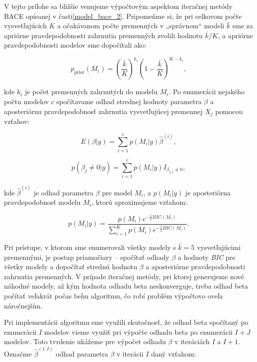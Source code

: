 V tejto prílohe sa bližšie venujeme výpočtovým aspektom iteračnej metódy BACE opísanej v časti\autoref{model_bace_2}.
Pripomeňme si, že pri celkovom počte vysvetľujúcich \(K\) a očakávanom počte premenných v „správnom“ modeli \(\bar{k}\)
sme za apriórne pravdepodobnosti zahrnutia premenných zvolili hodnotu \(\bar{k}/K\), a apriórne pravdepodobnosti modelov sme dopočítali ako:

\[
p_{\text{prior}}(M_i) = \left( \frac{\bar{k}}{K} \right)^{k_i} \left( 1 - \frac{\bar{k}}{K} \right)^{K - k_i},
\]

kde \( k_i \) je počet premenných zahrnutých do modelu \( M_i \).
Po enumerácii nejakého počtu modelov \(c\) spočítavame odhad strednej hodnoty parametra \(\beta\) a aposteriórnu pravdepodobnosť zahrnutia vysvetľujúcej premennej \(X_j\) pomocou vzťahov:

\[
    E(\beta | y) = \sum_{i = 1}^{c} p(M_i | y) \hat{\beta}^{(i)},
\]

\[
    p(\beta_j \neq 0 | y) = \sum_{i = 1}^{c} p(M_i | y) I_{\beta_{j, i} \neq 0},
\]

kde \(\hat{\beta}^{(i)}\) je odhad parametra \(\beta\) pre model \(M_i\), a \(p(M_i | y)\) je aposteriórna pravdepodobnosť modelu \(M_i\), ktorú aproximujeme vzťahom:

\[
    p(M_i | y) = \frac{p(M_i) e^{-\frac{1}{2}BIC(M_i)}}{\sum_{i = 1}^{K} p(M_i) e^{-\frac{1}{2}BIC(M_i)}}.
\]

Pri prístupe, v ktorom sme enumerovali všetky modely s \(\bar{k} = 5\) vysvetľujúcimi premennými, je postup priamočiary –
spočítať odhady \(\beta\) a hodnoty \emph{BIC} pre všetky modely a dopočítať strednú hodnotu \(\beta\) a aposteriórne pravdepodobnosti zahrnutia premenných.
V prípade iteračnej metódy, pri ktorej generujeme nové náhodné modely, až kým hodnota odhadu beta neskonverguje,
treba odhad beta počítať veľakrát počas behu algoritmu, čo robí problém výpočtovo oveľa náročnejším.

Pri implementácii algoritmu sme využili skutočnosť, že odhad beta spočítaný po enumerácii \(I\) modelov vieme využiť pri výpočte odhadu beta po enumerácii \(I + J\) modelov.
Toto tvrdenie ukážeme pre výpočet odhadu \(\beta\) v iteráciách \(I\) a \(I + 1\).
Označme \(\hat{\beta}^{(1:I)}\) odhad parametra \(\beta\) v iterácii \(I\) daný vzťahom:


